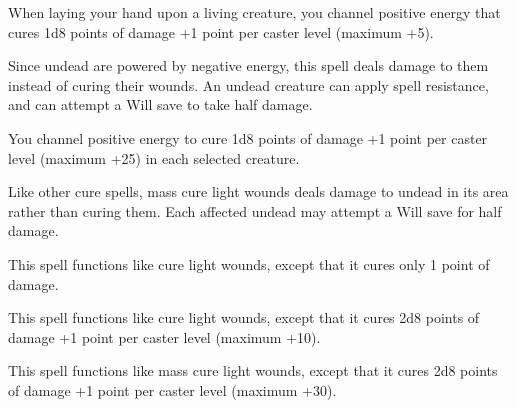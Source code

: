 \begin{multicols}{2}
\begin{small}
\noindent When laying your hand upon a living creature, you channel positive energy that cures 1d8 points of damage +1 point per caster level (maximum +5).

\smallskip\noindent Since undead are powered by negative energy, this spell deals damage to them instead of curing their wounds. An undead creature can apply spell resistance, and can attempt a Will save to take half damage.

\noindent You channel positive energy to cure 1d8 points of damage +1 point per caster level (maximum +25) in each selected creature.

\smallskip\noindent Like other cure spells, mass cure light wounds deals damage to undead in its area rather than curing them. Each affected undead may attempt a Will save for half damage.

\noindent This spell functions like cure light wounds, except that it cures only 1 point of damage.

\noindent This spell functions like cure light wounds, except that it cures 2d8 points of damage +1 point per caster level (maximum +10).

\noindent This spell functions like mass cure light wounds, except that it cures 2d8 points of damage +1 point per caster level (maximum +30).


\end{small}
\end{multicols}
